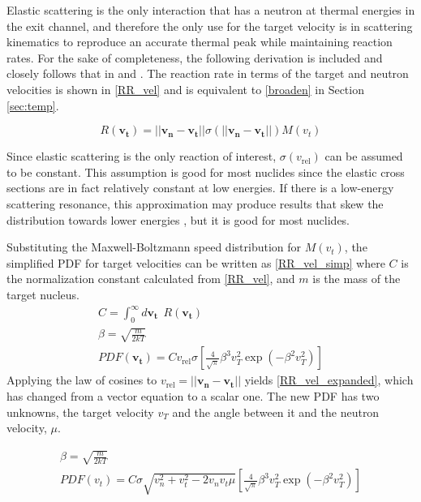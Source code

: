 Elastic scattering is the only interaction that has a neutron at thermal energies in the exit channel, and therefore the only use for the target velocity is in scattering kinematics to reproduce an accurate thermal peak while maintaining reaction rates.  For the sake of completeness, the following derivation is included and closely follows that in \cite{openmc} and \cite{gelbard}.  The reaction rate in terms of the target and neutron velocities is shown in \eqref{RR_vel} and is equivalent to \eqref{broaden} in Section \ref{sec:temp}.

\begin{equation}
\label{RR_vel}
R (\boldsymbol{v_t}) = ||\boldsymbol{v_n}-\boldsymbol{v_t}|| \sigma(||\boldsymbol{v_n}-\boldsymbol{v_t}||) M(v_t)
\end{equation}

Since elastic scattering is the only reaction of interest, $\sigma(v_\mathrm{rel})$ can be assumed to be constant.  This assumption is good for most nuclides since the elastic cross sections are in fact relatively constant at low energies.  If there is a low-energy scattering resonance, this approximation may produce results that skew the distribution towards lower energies \cite{openmc}, but it is good for most nuclides.  

Substituting the Maxwell-Boltzmann speed distribution for $M(v_t)$, the simplified PDF for target velocities can be written as \eqref{RR_vel_simp} where $C$ is the normalization constant calculated from \eqref{RR_vel}, and $m$ is the mass of the target nucleus.
%
\begin{equation}
\label{RR_vel_simp}
\begin{gathered}
C = \int_0^\infty d\boldsymbol{v_t} \:\: R(\boldsymbol{v_t}) \\
\beta = \sqrt{\frac{m}{2kT}} \\
PDF(\boldsymbol{v_t}) = C v_\mathrm{rel} \sigma \left[   \frac{4}{\sqrt{\pi}} \beta^3 v_T^2  \exp (- \beta^2  v_T^2 )      \right]
\end{gathered}
\end{equation}
Applying the law of cosines to $v_\mathrm{rel} = ||\boldsymbol{v_n}-\boldsymbol{v_t}||$ yields \eqref{RR_vel_expanded}, which has changed from a vector equation to a scalar one.   The new PDF has two unknowns, the target velocity $v_T$ and the angle between it and the neutron velocity, $\mu$.

\begin{equation}
\label{RR_vel_expanded}
\begin{gathered}
\beta = \sqrt{\frac{m}{2kT}} \\
PDF(v_t) = C \sigma  \sqrt{v_n^2+v_t^2-2 v_n v_t \mu} \left[   \frac{4}{\sqrt{\pi}} \beta^3 v_T^2  \exp ( -\beta^2  v_T^2 )      \right]
\end{gathered}
\end{equation}

